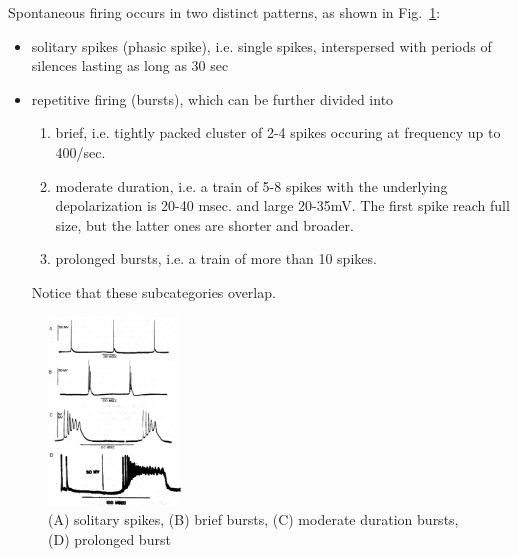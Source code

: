 \clearpage


Spontaneous firing occurs in two distinct patterns, as shown in
Fig.~\ref{fig:firing_patterns}:
\begin{itemize}
\item solitary spikes (phasic spike), i.e. single spikes, interspersed with
periods of silences lasting as long as 30 sec
  
\item repetitive firing (bursts), which can be further divided into 
  \begin{enumerate}
  \item brief, i.e. tightly packed cluster of 2-4 spikes occuring at
    frequency up to 400/sec. 
    
  \item moderate duration, i.e. a train of 5-8 spikes with the
    underlying depolarization is 20-40 msec. and large 20-35mV. The
    first spike reach full size, but the latter ones are shorter and
    broader.
     
  \item prolonged bursts, i.e. a train of more than  10 spikes.
  \end{enumerate}
Notice that these subcategories overlap. 
\end{itemize}

\begin{figure}[hbt]
  \centerline{\includegraphics[height=5cm,
    angle=0]{./images/firing_patterns.eps}}
  \caption{(A) solitary spikes, (B) brief bursts, (C) moderate
    duration bursts, (D) prolonged burst}
\label{fig:firing_patterns}
\end{figure}

